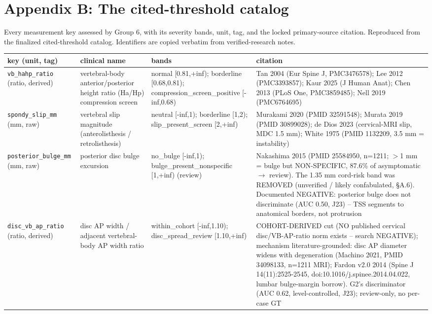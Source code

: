 \section{Appendix B: The cited-threshold catalog}
\label{app:catalog}
Every measurement key assessed by Group 6, with its severity bands, unit, tag, and the locked primary-source citation. Reproduced from the finalized cited-threshold catalog. Identifiers are copied verbatim from verified-research notes.
\begin{center}\footnotesize
\begin{longtable}{p{2.6cm} p{3.3cm} p{4.5cm} p{4.4cm}}
\toprule
key (unit, tag) & clinical name & bands & citation \\
\midrule \endhead
\texttt{vb\_hahp\_ratio} (ratio, derived) & vertebral-body anterior/posterior height ratio (Ha/Hp) compression screen & normal [0.81,+inf); borderline [0.68,0.81); compression\_screen\_positive [-inf,0.68) & Tan 2004 (Eur Spine J, PMC3476578); Lee 2012 (PMC3393857); Kaur 2025 (J Human Anat); Chen 2013 (PLoS One, PMC3859485); Nell 2019 (PMC6764695) \\
\addlinespace
\texttt{spondy\_slip\_mm} (mm, raw) & vertebral slip magnitude (anterolisthesis / retrolisthesis) & neutral [-inf,1); borderline [1,2); slip\_present\_screen [2,+inf) & Murakami 2020 (PMID 32591548); Murata 2019 (PMID 30899028); de Dios 2023 (cervical-MRI slip, MDC 1.5 mm); White 1975 (PMID 1132209, 3.5 mm = instability) \\
\addlinespace
\texttt{posterior\_bulge\_mm} (mm, raw) & posterior disc bulge excursion & no\_bulge [-inf,1); bulge\_present\_nonspecific [1,+inf) (review) & Nakashima 2015 (PMID 25584950, n=1211; $>$1 mm = bulge but NON-SPECIFIC, 87.6\% of asymptomatic $\rightarrow$ review). The 1.35 mm cord-risk band was REMOVED (unverified / likely confabulated, \S A.6). Documented NEGATIVE: posterior bulge does not discriminate (AUC 0.50, J23) -- TSS segments to anatomical borders, not protrusion \\
\addlinespace
\texttt{disc\_vb\_ap\_ratio} (ratio, derived) & disc AP width / adjacent vertebral-body AP width ratio & within\_cohort [-inf,1.10); disc\_spread\_review [1.10,+inf) & COHORT-DERIVED cut (NO published cervical disc/VB-AP-ratio norm exists -- search NEGATIVE); mechanism literature-grounded: disc AP diameter widens with degeneration (Machino 2021, PMID 34098133, n=1211 MRI); Fardon v2.0 2014 (Spine J 14(11):2525-2545, doi:10.1016/j.spinee.2014.04.022, lumbar bulge-margin borrow). G2's discriminator (AUC 0.62, level-controlled, J23); review-only, no per-case GT \\

\end{longtable}
\end{center}
